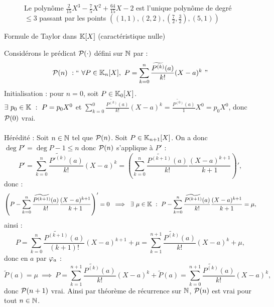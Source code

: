 \documentclass{article}
\renewenvironment{question_kholle}[2][ ]
{
	\subsection{\texorpdfstring{#2}{}}
	\notblank{#1}
	{
		\noindent #1
		\bigbreak
	}
	{}
	\begin{proof}
}
{
	\end{proof}
}
\begin{document}
\begin{question_kholle}
\begin{figure}[H]
    \caption{Le polynôme $\frac{2}{15}X^3 - \frac 7 5 X^2 + \frac{64}{15}X - 2$ est l'unique polynôme de degré $\leqslant 3$ passant par les points $\displaystyle \left((1, 1), (2, 2), \left(\frac 7 2, \frac 3 2 \right), (5, 1)\right)$}
  \end{figure}
  
\end{question_kholle}

\begin{question_kholle}
  [Soient $P$ à coefficients dans $\K$ et $a\in \K$. On a :
  \begin{equation}
    P = \sum_{n\in \N}\frac{\widetilde{P^{(n)}}(a)}{n!}(X-a)^n
  \end{equation}
  ]
  {Formule de Taylor dans $\mathbb K [X]$ (caractéristique nulle)}
  
  Considérons le prédicat $\mathcal P (\cdot)$ défini sur $\mathbb N$ par :
  \[
  \PRIME (n ) \ :  \text{\textquotedblleft} \ \forall P \in \K _n[X], \ P = \sum_{k = 0}^n\frac{\widetilde{P^{(k)}}(a)}{k!}(X-a)^k \ \text{\textquotedblright}
  \]
  Initialisation : pour $n = 0 $, soit $P\in \mathbb K _0 [X]$. \\
  $\exists \ p_0 \in \mathbb K \ : \ P = p_0 X^0$ et $\sum_{k = 0}^0\frac{\widetilde{P^{(k)}}(a)}{k!}(X-a)^k = \frac{\widetilde{P^{(0)}}(a)}{1}X^0 = p_0 X^0$, donc $\mathcal P (0)$ vrai. \\ \\
  Hérédité : Soit $n\in \mathbb N$ tel que $\mathcal P (n)$. Soit $P\in \mathbb K _{n+1} [X]$. On a donc $\deg P' = \deg P -1 \leq n$ donc $\mathcal P (n)$ s'applique à $P'$ :
  \[
  P' = \sum_{k = 0}^n\frac{\widetilde{P'^{(k)}}(a)}{k!}(X-a)^k = \left( \sum_{k = 0}^n\frac{\widetilde{P^{(k+1)}}(a)}{k!}\frac{(X-a)^{k+1}}{k+1} \right) ',
  \]
  donc :
  \[
  \left( P - \sum_{k = 0}^n\frac{\widetilde{P^{(k+1)}}(a)}{k!}\frac{(X-a)^{k+1}}{k+1} \right) ' = 0 \ \implies \ \exists \ \mu \in \mathbb K \ : \ P - \sum_{k = 0}^n\frac{\widetilde{P^{(k+1)}}(a)}{k!}\frac{(X-a)^{k+1}}{k+1} = \mu ,
  \]
  ainsi :
  \[
  P = \sum_{k = 0}^n\frac{\widetilde{P^{(k+1)}}(a)}{(k+1)!}(X-a)^{k+1} + \mu = \sum_{k = 1}^{n+1}\frac{\widetilde{P^{(k)}}(a)}{k!}(X-a)^{k} + \mu,
  \]
  donc en $a$ par $\varphi _ a$ :
  \[
  \widetilde{P}(a) = \mu \ \implies \ P = \sum_{k = 1}^{n+1}\frac{\widetilde{P^{(k)}}(a)}{k!}(X-a)^{k} + \widetilde{P}(a) = \sum_{k = 0}^{n+1}\frac{\widetilde{P^{(k)}}(a)}{k!}(X-a)^{k},
  \]
  donc $\mathcal P (n+1) $ vrai. Ainsi par théorème de récurrence sur $\mathbb N$, $\mathcal P (n)$ est vrai pour tout $n\in \mathbb N$.
\end{question_kholle}
\end{document}
